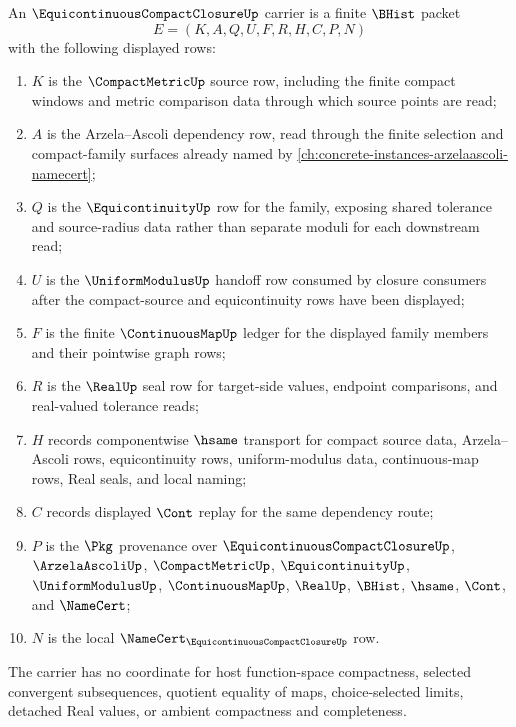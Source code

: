 \begin{definition}
\label{def:equicontinuous-compact-closure-carrier}
An $\EquicontinuousCompactClosureUp$ carrier is a finite $\BHist$ packet
$$
E=(K,A,Q,U,F,R,H,C,P,N)
$$
with the following displayed rows:
\begin{enumerate}
\item $K$ is the $\CompactMetricUp$ source row, including the finite compact windows and metric comparison data through which source points are read;
\item $A$ is the Arzela--Ascoli dependency row, read through the finite selection and compact-family surfaces already named by \autoref{ch:concrete-instances-arzelaascoli-namecert};
\item $Q$ is the $\EquicontinuityUp$ row for the family, exposing shared tolerance and source-radius data rather than separate moduli for each downstream read;
\item $U$ is the $\UniformModulusUp$ handoff row consumed by closure consumers after the compact-source and equicontinuity rows have been displayed;
\item $F$ is the finite $\ContinuousMapUp$ ledger for the displayed family members and their pointwise graph rows;
\item $R$ is the $\RealUp$ seal row for target-side values, endpoint comparisons, and real-valued tolerance reads;
\item $H$ records componentwise $\hsame$ transport for compact source data, Arzela--Ascoli rows, equicontinuity rows, uniform-modulus data, continuous-map rows, Real seals, and local naming;
\item $C$ records displayed $\Cont$ replay for the same dependency route;
\item $P$ is the $\Pkg$ provenance over $\EquicontinuousCompactClosureUp$, $\ArzelaAscoliUp$, $\CompactMetricUp$, $\EquicontinuityUp$, $\UniformModulusUp$, $\ContinuousMapUp$, $\RealUp$, $\BHist$, $\hsame$, $\Cont$, and $\NameCert$;
\item $N$ is the local $\NameCert_{\EquicontinuousCompactClosureUp}$ row.
\end{enumerate}
The carrier has no coordinate for host function-space compactness, selected convergent subsequences, quotient equality of maps, choice-selected limits, detached Real values, or ambient compactness and completeness.
\end{definition}

